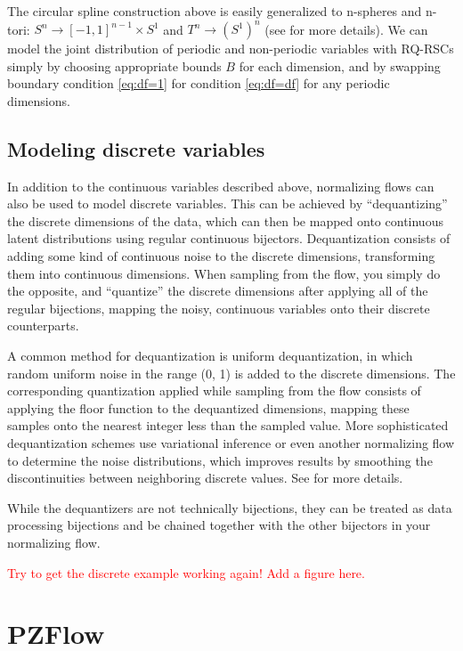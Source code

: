 \documentclass[twocolumn]{aastex631}
\newcommand{\note}[1]{\textsf{\textcolor{red}{#1}}}
\begin{document}
The circular spline construction above is easily generalized to n-spheres and n-tori: $S^n \to [-1, 1]^{n-1} \times S^1$ and $T^n \to (S^1)^n$ (see \citealt{rezende2020} for more details).
We can model the joint distribution of periodic and non-periodic variables with RQ-RSCs simply by choosing appropriate bounds $B$ for each dimension, and by swapping boundary condition \ref{eq:df=1} for condition \ref{eq:df=df} for any periodic dimensions.


\subsection{Modeling discrete variables}
\label{sec:discrete}

In addition to the continuous variables described above, normalizing flows can also be used to model discrete variables.
This can be achieved by ``dequantizing'' the discrete dimensions of the data, which can then be mapped onto continuous latent distributions using regular continuous bijectors.
Dequantization consists of adding some kind of continuous noise to the discrete dimensions, transforming them into continuous dimensions.
When sampling from the flow, you simply do the opposite, and ``quantize'' the discrete dimensions after applying all of the regular bijections, mapping the noisy, continuous variables onto their discrete counterparts.

A common method for dequantization is uniform dequantization, in which random uniform noise in the range (0, 1) is added to the discrete dimensions.
The corresponding quantization applied while sampling from the flow consists of applying the floor function to the dequantized dimensions, mapping these samples onto the nearest integer less than the sampled value.
More sophisticated dequantization schemes use variational inference or even another normalizing flow to determine the noise distributions, which improves results by smoothing the discontinuities between neighboring discrete values.
See \citet{ho2019} \citet{hoogeboom2020} for more details.

While the dequantizers are not technically bijections, they can be treated as data processing bijections and be chained together with the other bijectors in your normalizing flow.

\note{Try to get the discrete example working again! Add a figure here.}


\section{PZFlow}
\label{sec:pzflow}
\end{document}
